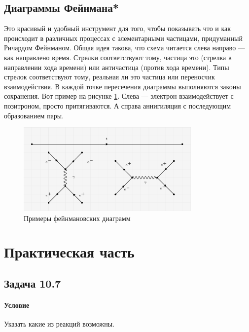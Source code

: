 \documentclass[12pt]{article}
\begin{document}
\subsection*{Диаграммы Фейнмана*}
Это красивый и удобный инструмент для того, чтобы показывать что и как происходит в различных процессах с элементарными частицами, придуманный Ричардом Фейнманом. Общая идея такова, что схема читается слева направо --- как направлено время. Стрелки соответствуют тому, частица это (стрелка в направлении хода времени) или античастица (против хода времени). Типы стрелок соответствуют тому, реальная ли это частица или переносчик взаимодействия. В каждой точке пересечения диаграммы выполняются законы сохранения. Вот пример на рисунке \ref{fig:sem_11_fey}. Слева --- электрон взаимодействует с позитроном, просто притягиваются. А справа аннигиляция с последующим образованием пары.
\begin{figure}[h]
    \centering
    \includegraphics[width=0.8\textwidth,height=\textheight,keepaspectratio]{Seminar_11-12/pics/pic_05_fey.PNG}
    \caption{Примеры фейнмановских диаграмм}
    \label{fig:sem_11_fey}
\end{figure}

\section{Практическая часть}
\subsection{Задача 10.7}
\label{task_10.7}
\paragraph{Условие}
Указать какие из реакций возможны.
\end{document}
